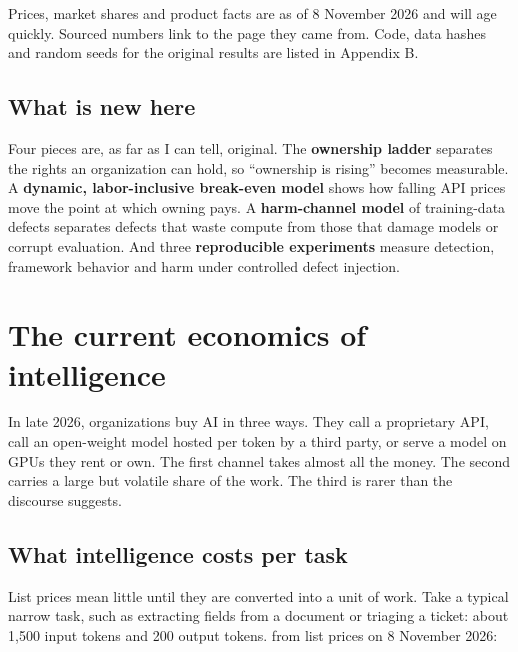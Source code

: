 Prices, market shares and product facts are as of 8 November 2026 and will age quickly. Sourced numbers link to the page they came from. Code, data hashes and random seeds for the original results are listed in Appendix B.

\subsection{What is new here}

Four pieces are, as far as I can tell, original. The \textbf{ownership ladder} separates the rights an organization can hold, so ``ownership is rising'' becomes measurable. A \textbf{dynamic, labor-inclusive break-even model} shows how falling API prices move the point at which owning pays. A \textbf{harm-channel model} of training-data defects separates defects that waste compute from those that damage models or corrupt evaluation. And three \textbf{reproducible experiments} measure detection, framework behavior and harm under controlled defect injection.

\section{The current economics of intelligence}

In late 2026, organizations buy AI in three ways. They call a proprietary API, call an open-weight model hosted per token by a third party, or serve a model on GPUs they rent or own. The first channel takes almost all the money. The second carries a large but volatile share of the work. The third is rarer than the discourse suggests.

\subsection{What intelligence costs per task}

List prices mean little until they are converted into a unit of work. Take a typical narrow task, such as extracting fields from a document or triaging a ticket: about 1,500 input tokens and 200 output tokens.  from list prices on 8 November 2026:

